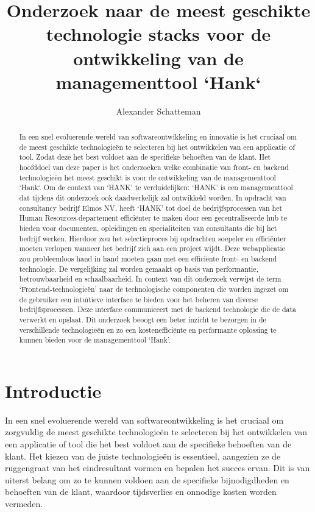 \documentclass{hogent-article}
\title{Onderzoek naar de meest geschikte technologie stacks voor de ontwikkeling van de managementtool `Hank`}
\author{Alexander Schatteman}
\begin{document}
\begin{abstract}
    In een snel e\-vo\-lu\-erende wereld van softwareontwikkeling en innovatie is het cruciaal om de meest geschikte technologieën te se\-lec\-teren bij het ontwikkelen van een applicatie of tool. Zodat deze het best voldoet aan de specifieke behoeften van de klant.
    \bigbreak
    Het hoofddoel van deze paper is het onderzoeken welke combinatie van front- en backend technologieën het meest geschikt is voor de ontwikkeling van de managementtool `Hank`.
    \bigbreak
    Om de context van `HANK' te verduidelijken: `HANK' is een managementtool dat tijdens dit onderzoek ook daadwerkelijk zal ontwikkeld worden. In opdracht van consultancy bedrijf Elmos NV, heeft `HANK' tot doel de bedrijfsprocessen van het Human Resources-departement efficiënter te maken door een gecentraliseerde hub te bieden voor documenten, opleidingen en specialiteiten van consultants die bij het bedrijf werken. Hierdoor zou het selectieproces bij opdrachten soepeler en efficiënter moeten verlopen wanneer het bedrijf zich aan een project wijdt. Deze webapplicatie zou probleemloos hand in hand moeten gaan met een efficiënte front- en backend technologie. 
    \bigbreak 
    De vergelijking zal worden gemaakt op basis van performantie, betrouwbaarheid en schaalbaarheid. In context van dit onderzoek verwijst de term `Frontend-technologieën' naar de technologische componenten die worden ingezet om de gebruiker een intuïtieve interface te bieden voor het beheren van diverse bedrijfsprocessen. Deze interface communiceert met de backend technologie die de data verwerkt en opslaat. 
    \bigbreak
    Dit onderzoek beoogt een beter inzicht te bezorgen in de verschillende technologieën en zo een kostenefficiënte en performante oplossing te kunnen bieden voor de managementtool `Hank'.
\end{abstract}

\tableofcontents
\section{Introductie}%
\label{sec:introductie}
  In een snel evoluerende wereld van softwareontwikkeling is het cruciaal om zorgvuldig de meest geschikte technologieën te selecteren bij het ontwikkelen van een applicatie of tool die het best voldoet aan de specifieke behoeften van de klant.
  Het kiezen van de juiste technologieën is essentieel, aangezien ze de ruggengraat van het eindresultaat vormen en bepalen het succes ervan. Dit is van uiterst belang om zo te kunnen voldoen aan de specifieke bijnodigdheden en behoeften van de klant, waardoor tijdsverlies en onnodige kosten worden vermeden. 
  
\end{document}
